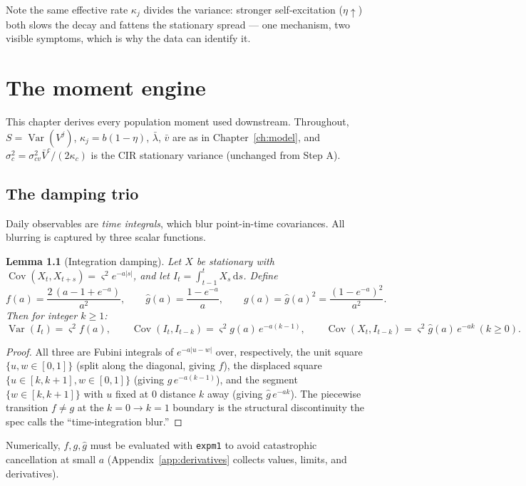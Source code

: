 \documentclass[11pt]{report}
\newtheorem{lemma}[theorem]{Lemma}
\theoremstyle{definition}
\theoremstyle{remark}
\newcommand{\Var}{\operatorname{Var}}
\newcommand{\Cov}{\operatorname{Cov}}
\newcommand{\dd}{\,\mathrm{d}}
\newcommand{\Vj}{V^{j}}
\begin{document}
Note the same effective rate $\kappa_{j}$ divides the variance: stronger
self-excitation ($\eta\uparrow$) both slows the decay and fattens the
stationary spread --- one mechanism, two visible symptoms, which is why the
data can identify it.

\chapter{The moment engine}
\label{ch:moments}

This chapter derives every population moment used downstream. Throughout,
$S=\Var(\Vj)$, $\kappa_{j}=b(1-\eta)$, $\bar\lambda$, $\bar v$ are as in
Chapter~\ref{ch:model}, and $\sigma_{c}^{2}=\sigma_{cv}^{2}\bar V^{c}/(2\kappa_{c})$
is the CIR stationary variance (unchanged from Step A).

\section{The damping trio}

Daily observables are \emph{time integrals}, which blur point-in-time
covariances. All blurring is captured by three scalar functions.

\begin{lemma}[Integration damping]\label{lem:damping}
Let $X$ be stationary with $\Cov(X_{t},X_{t+s})=\varsigma^{2}e^{-a|s|}$, and
let $I_{t}=\int_{t-1}^{t}X_{s}\dd s$. Define
\[
f(a)=\frac{2\,(a-1+e^{-a})}{a^{2}},\qquad
\hat g(a)=\frac{1-e^{-a}}{a},\qquad
g(a)=\hat g(a)^{2}=\frac{(1-e^{-a})^{2}}{a^{2}} .
\]
Then for integer $k\ge1$:
\[
\Var(I_{t})=\varsigma^{2}f(a),\qquad
\Cov(I_{t},I_{t-k})=\varsigma^{2}g(a)\,e^{-a(k-1)},\qquad
\Cov(X_{t},I_{t-k})=\varsigma^{2}\hat g(a)\,e^{-ak}\ (k\ge0).
\]
\end{lemma}

\begin{proof}
All three are Fubini integrals of $e^{-a|u-w|}$ over, respectively, the unit
square $\{u,w\in[0,1]\}$ (split along the diagonal, giving $f$), the
displaced square $\{u\in[k,k+1],w\in[0,1]\}$ (giving $g\,e^{-a(k-1)}$), and
the segment $\{w\in[k,k+1]\}$ with $u$ fixed at $0$ distance $k$ away (giving
$\hat g\,e^{-ak}$). The piecewise transition $f\ne g$ at the $k{=}0\to
k{=}1$ boundary is the structural discontinuity the spec calls the
``time-integration blur.''
\end{proof}

Numerically, $f,g,\hat g$ must be evaluated with \texttt{expm1} to avoid
catastrophic cancellation at small $a$ (Appendix~\ref{app:derivatives}
collects values, limits, and derivatives).
\end{document}
